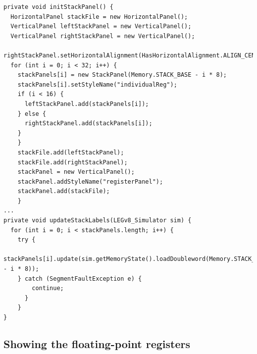 \begin{lstlisting}[float, caption={Stack panels' logic}, label={lst:stackpanelupd}]
private void initStackPanel() {
  HorizontalPanel stackFile = new HorizontalPanel();
  VerticalPanel leftStackPanel = new VerticalPanel();
  VerticalPanel rightStackPanel = new VerticalPanel();
  rightStackPanel.setHorizontalAlignment(HasHorizontalAlignment.ALIGN_CENTER);
  for (int i = 0; i < 32; i++) {
    stackPanels[i] = new StackPanel(Memory.STACK_BASE - i * 8);
    stackPanels[i].setStyleName("individualReg");
    if (i < 16) {
      leftStackPanel.add(stackPanels[i]);
    } else {
      rightStackPanel.add(stackPanels[i]);
    }
    }
    stackFile.add(leftStackPanel);
    stackFile.add(rightStackPanel);
    stackPanel = new VerticalPanel();
    stackPanel.addStyleName("registerPanel");
    stackPanel.add(stackFile);
    }
...
private void updateStackLabels(LEGv8_Simulator sim) {
  for (int i = 0; i < stackPanels.length; i++) {
    try {
      stackPanels[i].update(sim.getMemoryState().loadDoubleword(Memory.STACK_BASE - i * 8));
    } catch (SegmentFaultException e) {
        continue;
      }
    }
}
\end{lstlisting}
\subsection{Showing the floating-point registers}
